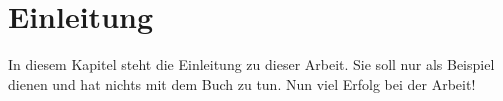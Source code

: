 \chapter{Einleitung}

In diesem Kapitel steht die Einleitung zu dieser Arbeit.
Sie soll nur als Beispiel dienen und hat nichts mit dem Buch \cite{WSPA} zu tun.
Nun viel Erfolg bei der Arbeit!
